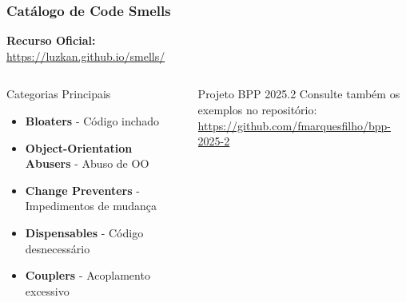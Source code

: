 \documentclass[aspectratio=169]{beamer}
\begin{document}
\begin{frame}
\frametitle{Catálogo de Code Smells}
\begin{center}
\textbf{Recurso Oficial:} \\
\vspace{0.3cm}
\Large \url{https://luzkan.github.io/smells/}
\end{center}

\vspace{0.5cm}
\begin{columns}
\begin{column}{0.5\textwidth}
\begin{block}{Categorias Principais}
\footnotesize
\begin{itemize}
    \item \textbf{Bloaters} - Código inchado
    \item \textbf{Object-Orientation Abusers} - Abuso de OO
    \item \textbf{Change Preventers} - Impedimentos de mudança
    \item \textbf{Dispensables} - Código desnecessário
    \item \textbf{Couplers} - Acoplamento excessivo
\end{itemize}
\end{block}
\end{column}

\begin{column}{0.5\textwidth}
\begin{alertblock}{Projeto BPP 2025.2}
\footnotesize
Consulte também os exemplos no repositório: \\
\vspace{0.2cm}
\url{https://github.com/fmarquesfilho/bpp-2025-2}
\end{alertblock}
\end{column}
\end{columns}
\end{frame}
\end{document}
